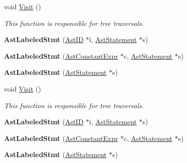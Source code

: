 \begin{DoxyCompactItemize}
\item 
void \hyperlink{classAstLabeledStmt_a2477cd4279ec466452407604e0897261}{Visit} ()
\begin{DoxyCompactList}\small\item\em This function is responsible for tree traversals. \end{DoxyCompactList}\item 
\hypertarget{classAstLabeledStmt_aca812c738648cde75efb63b54ea4083d}{{\bfseries Ast\-Labeled\-Stmt} (\hyperlink{classAstID}{Ast\-I\-D} $\ast$i, \hyperlink{classAstStatement}{Ast\-Statement} $\ast$s)}\label{classAstLabeledStmt_aca812c738648cde75efb63b54ea4083d}

\item 
\hypertarget{classAstLabeledStmt_a49285a53627a00f502fa04afb2a72d47}{{\bfseries Ast\-Labeled\-Stmt} (\hyperlink{classAstConstantExpr}{Ast\-Constant\-Expr} $\ast$c, \hyperlink{classAstStatement}{Ast\-Statement} $\ast$s)}\label{classAstLabeledStmt_a49285a53627a00f502fa04afb2a72d47}

\item 
\hypertarget{classAstLabeledStmt_a545ffe76c4ebdc254a554f655b1d19e4}{{\bfseries Ast\-Labeled\-Stmt} (\hyperlink{classAstStatement}{Ast\-Statement} $\ast$s)}\label{classAstLabeledStmt_a545ffe76c4ebdc254a554f655b1d19e4}

\item 
void \hyperlink{classAstLabeledStmt_a2477cd4279ec466452407604e0897261}{Visit} ()
\begin{DoxyCompactList}\small\item\em This function is responsible for tree traversals. \end{DoxyCompactList}\item 
\hypertarget{classAstLabeledStmt_aca812c738648cde75efb63b54ea4083d}{{\bfseries Ast\-Labeled\-Stmt} (\hyperlink{classAstID}{Ast\-I\-D} $\ast$i, \hyperlink{classAstStatement}{Ast\-Statement} $\ast$s)}\label{classAstLabeledStmt_aca812c738648cde75efb63b54ea4083d}

\item 
\hypertarget{classAstLabeledStmt_a49285a53627a00f502fa04afb2a72d47}{{\bfseries Ast\-Labeled\-Stmt} (\hyperlink{classAstConstantExpr}{Ast\-Constant\-Expr} $\ast$c, \hyperlink{classAstStatement}{Ast\-Statement} $\ast$s)}\label{classAstLabeledStmt_a49285a53627a00f502fa04afb2a72d47}

\item 
\hypertarget{classAstLabeledStmt_a545ffe76c4ebdc254a554f655b1d19e4}{{\bfseries Ast\-Labeled\-Stmt} (\hyperlink{classAstStatement}{Ast\-Statement} $\ast$s)}\label{classAstLabeledStmt_a545ffe76c4ebdc254a554f655b1d19e4}


\end{DoxyCompactItemize}
